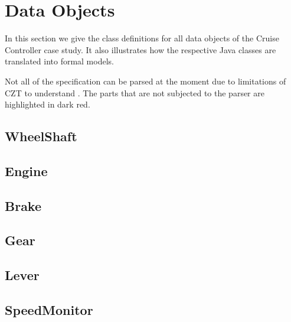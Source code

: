 \documentclass{article}
\begin{document}
\section{Data Objects}

In this section we give the {\OhCircus} class definitions for all data objects of the Cruise Controller case study. It also illustrates how the respective Java classes are translated into formal models.

Not all of the specification can be parsed at the moment due to limitations of CZT to understand {\OhCircus}. The parts that are not subjected to the parser are highlighted in dark red.

\subsection{WheelShaft}



\newpage

\subsection{Engine}



\newpage

\subsection{Brake}



\newpage

\subsection{Gear}



\newpage

\subsection{Lever}



\newpage

\subsection{SpeedMonitor}
\end{document}
